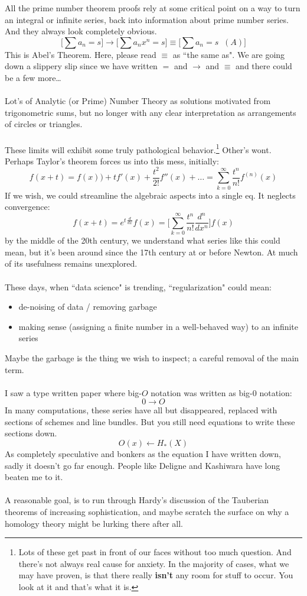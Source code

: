\documentclass[12pt]{article}
\begin{document}
\newpage

\noindent 
All the prime number theorem proofs rely at some critical point on a way to turn an integral or infinite series, back into information about prime number series.  And they always look completely obvious.  
$$   \Bigg[ \sum a_n = s \Bigg]
\to \Bigg[ \sum a_n x^n  = s \Bigg] \equiv \Bigg[ \sum a_n = s \;\;(A)\Bigg]   $$
This is Abel's Theorem.  Here, please read $\equiv$ as ``the same as".  We are going down a slippery slip since we have written $=$ and $\to$ and $\equiv$ and there could be a few more\dots \\ \\ 
Lot's of Analytic (or Prime) Number Theory as solutions motivated from trigonometric sums, but no longer with any clear interpretation as arrangements of circles or triangles. \\ \\
 These limits will exhibit some truly pathological behavior.\footnote{Lots of these get past in front of our faces without too much question.  And there's not always real cause for anxiety.  In the majority of cases, what we may have proven, is that there really \textbf{isn't} any room for stuff to occur.  You look at it and that's what it is.}  Other's wont.  Perhaps Taylor's theorem forces us into this mess, initially:
$$ f(x + t) = f(x) ) + t f'(x) + \frac{t^2}{2!} f''(x) + \dots = \sum_{k=0}^\infty \frac{t^n}{n!} f^{(n)}(x) $$ 
If we wish, we could streamline the algebraic aspects into a single eq.  It neglects convergence:
$$ f(x+t) = e^{t \, \frac{d}{dx}} f(x) = \Bigg[ \sum_{k=0}^\infty \frac{t^n}{n!} \frac{d^n}{dx^n}\Bigg] f(x)  $$
by the middle of the 20th century, we understand what series like this could mean, but it's been around since the 17th century at or before Newton. At much of its usefulness remains unexplored. \\ \\
These days, when ``data science" is trending, ``regularization" could mean: 
\begin{itemize}
\item de-noising of data / removing garbage
\item making sense (assigning a finite number in a well-behaved way) to an infinite series
\end{itemize}
Maybe the garbage is the thing we wish to inspect; a careful removal of the main term. \\ \\
I saw a type written paper where big-$O$ notation was written as big-$0$ notation:
$$ 0 \to O $$
In many computations, these series have all but disappeared, replaced with sections of schemes and line bundles.  But you still need equations to write these sections down. 
$$ O(x) \leftarrow H_\ast(X) $$
As completely speculative and bonkers as the equation I have written down, sadly it doesn't go far enough.  People like Deligne and Kashiwara have long beaten me to it. \\ \\
A reasonable goal, is to run through Hardy's discussion of the Tauberian theorems of increasing sophistication, and maybe scratch the surface on why a homology theory might be lurking there after all.
\end{document}
